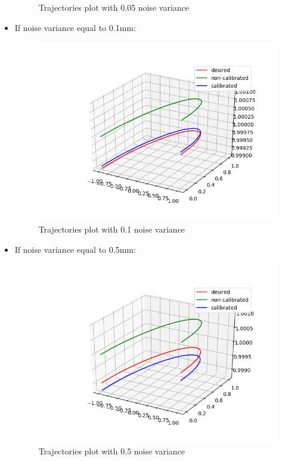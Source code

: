 \documentclass[12pt]{article}
\begin{document}
\begin{itemize}
\begin{figure}[H]
			\caption{Trajectories plot with 0.05 noise variance}
		\end{figure}
		\item If noise variance equal to 0.1mm:
		\begin{figure}[H]
			\centering
			\includegraphics[scale=0.6]{1noise.png}
			\caption{Trajectories plot with 0.1 noise variance}
		\end{figure}
		\item If noise variance equal to 0.5mm:
		\begin{figure}[H]
			\centering
			\includegraphics[scale=0.6]{10noise.png}
			\caption{Trajectories plot with 0.5 noise variance}
		\end{figure}
	\end{itemize}
\end{document}
